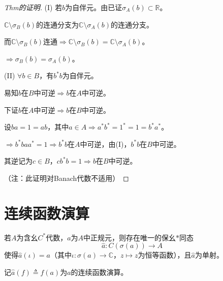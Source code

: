 \documentclass[lang=cn,a4paper,newtx,section]{elegantbook}
\begin{document}
\begin{proof}[Thm的证明]
  (I) 若$b$为自伴元。由已证$\sigma_A(b) \subset \mathbb{R}$。
  
  $\mathbb{C} \setminus \sigma_B(b)$的连通分支为$\mathbb{C} \setminus \sigma_A(b)$的连通分支。
  
  而$\mathbb{C} \setminus \sigma_B(b)$连通$\Rightarrow \mathbb{C} \setminus \sigma_B(b) = \mathbb{C} \setminus \sigma_A(b)$。
  
  $\Rightarrow \sigma_B(b) = \sigma_A(b)$。
  
  (II) $\forall b \in B$，有$b^*b$为自伴元。
  
  易知$b$在$B$中可逆$\Rightarrow b$在$A$中可逆。
  
  下证$b$在$A$中可逆$\Rightarrow b$在$B$中可逆。
  
  设$ba = 1 = ab$，其中$a \in A \Rightarrow a^*b^* = 1^* = 1 = b^*a^*$。
  
  $\Rightarrow b^*ba a^* = 1 \Rightarrow b^*b$在$A$中可逆，由(I)，$b^*b$在$B$中可逆。
  
  其逆记为$c \in B$，$cb^*b = 1 \Rightarrow b$在$B$中可逆。
  
  （注：此证明对Banach代数不适用）
\end{proof}

\section{连续函数演算}

\begin{theorem}[连续函数演算]
  若$A$为含幺$C^*$代数，$a$为$A$中正规元，则存在唯一的保幺$*$同态
  \begin{equation*}
    \hat{a}: C(\sigma(a)) \longrightarrow A
  \end{equation*}
  使得$\hat{a}(\iota) = a$（其中$\iota: \sigma(a) \to \mathbb{C}$，$z \mapsto z$为恒等函数），且$\hat{a}$为单射。
  
  记$\hat{a}(f) \triangleq f(a)$为$a$的连续函数演算。
\end{theorem}
\end{document}
